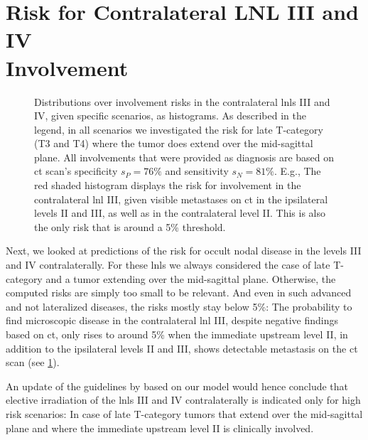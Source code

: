 \documentclass[\relativeRoot/main.tex]{subfiles}
\begin{document}
\section[Risk for Contralateral LNL III and IV Involvement]{Risk for Contralateral LNL III and IV\\Involvement}
\label{sec:complete:contraIIIandIV}

\begin{figure}
    \centering
    \def\svgwidth{1.0\textwidth}
    
    \caption[
        Risks for the contralateral LNLs III and IV, predicted by the complete model
    ]{
        Distributions over involvement risks in the contralateral \glspl{lnl} III and IV, given specific scenarios, as histograms. As described in the legend, in all scenarios we investigated the risk for late T-category (T3 and T4) where the tumor does extend over the mid-sagittal plane. All involvements that were provided as diagnosis are based on \gls{ct} scan's specificity $s_P = 76\%$ and sensitivity $s_N = 81\%$. E.g., The red shaded histogram displays the risk for involvement in the contralateral \gls{lnl} III, given visible metastases on \gls{ct} in the ipsilateral levels II and III, as well as in the contralateral level II. This is also the only risk that is around a 5\% threshold.
    }
    \label{fig:complete:contraIIIandIV}
\end{figure}

Next, we looked at predictions of the risk for occult nodal disease in the levels III and IV contralaterally. For these \glspl{lnl} we always considered the case of late T-category and a tumor extending over the mid-sagittal plane. Otherwise, the computed risks are simply too small to be relevant. And even in such advanced and not lateralized diseases, the risks mostly stay below 5\%: The probability to find microscopic disease in the contralateral \gls{lnl} III, despite negative findings based on \gls{ct}, only rises to around 5\% when the immediate upstream level II, in addition to the ipsilateral levels II and III, shows detectable metastasis on the \gls{ct} scan (see \cref{fig:complete:contraIIIandIV}).

An update of the guidelines by  based on our model would hence conclude that elective irradiation of the \glspl{lnl} III and IV contralaterally is indicated only for high risk scenarios: In case of late T-category tumors that extend over the mid-sagittal plane and where the immediate upstream level II is clinically involved.
\end{document}
